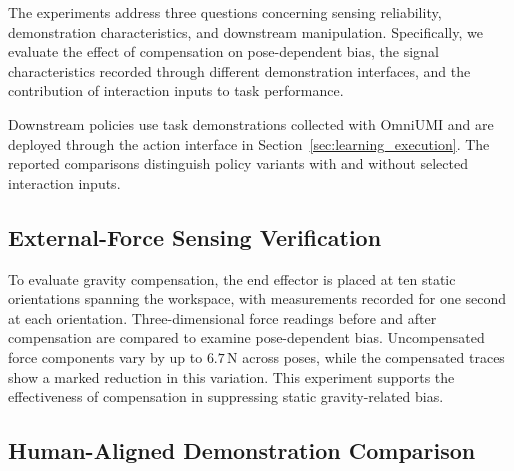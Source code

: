 The experiments address three questions concerning sensing reliability, demonstration characteristics, and downstream manipulation.
Specifically, we evaluate the effect of compensation on pose-dependent bias, the signal characteristics recorded through different demonstration interfaces, and the contribution of interaction inputs to task performance.

Downstream policies use task demonstrations collected with OmniUMI and are deployed through the action interface in Section~\ref{sec:learning_execution}.
The reported comparisons distinguish policy variants with and without selected interaction inputs.

\subsection{External-Force Sensing Verification}

To evaluate gravity compensation, the end effector is placed at ten static orientations spanning the workspace, with measurements recorded for one second at each orientation.
Three-dimensional force readings before and after compensation are compared to examine pose-dependent bias.
Uncompensated force components vary by up to $6.7\,\mathrm{N}$ across poses, while the compensated traces show a marked reduction in this variation.
This experiment supports the effectiveness of compensation in suppressing static gravity-related bias.

\subsection{Human-Aligned Demonstration Comparison}

